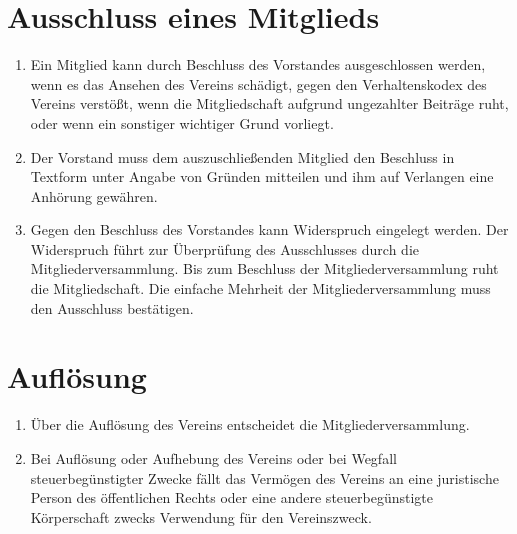 \documentclass[a4paper, 12pt]{scrartcl}
\begin{document}
\section{Ausschluss eines Mitglieds}
\begin{enumerate}
  \item Ein Mitglied kann durch Beschluss des Vorstandes ausgeschlossen werden, wenn es das Ansehen des Vereins schädigt, gegen den Verhaltenskodex des Vereins verstößt, wenn die Mitgliedschaft aufgrund ungezahlter Beiträge ruht, oder wenn ein sonstiger wichtiger Grund vorliegt.
  \item Der Vorstand muss dem auszuschließenden Mitglied den Beschluss in Textform unter Angabe von Gründen mitteilen und ihm auf Verlangen eine Anhörung gewähren.
  \item Gegen den Beschluss des Vorstandes kann Widerspruch eingelegt werden. Der Widerspruch führt zur Überprüfung des Ausschlusses durch die Mitgliederversammlung. Bis zum Beschluss der Mitgliederversammlung ruht die Mitgliedschaft. Die einfache Mehrheit der Mitgliederversammlung muss den Ausschluss bestätigen.
\end{enumerate}

\section{Auflösung}
\begin{enumerate}
  \item Über die Auflösung des Vereins entscheidet die Mitgliederversammlung.
  \item Bei Auflösung oder Aufhebung des Vereins oder bei Wegfall steuerbegünstigter Zwecke fällt das Vermögen des Vereins an eine juristische Person des öffentlichen Rechts oder eine andere steuerbegünstigte Körperschaft zwecks Verwendung für den Vereinszweck.
\end{enumerate}
\end{document}
